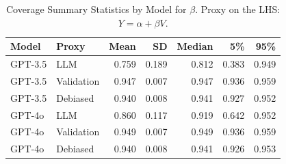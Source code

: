 \begin{table}

\caption{Coverage Summary Statistics by Model for $\beta$. Proxy on the LHS: $Y = \alpha + \beta V$.}
\centering
\begin{tabular}[t]{llrrrrr}
\toprule
Model & Proxy & Mean & SD & Median & 5\% & 95\%\\
\midrule
GPT-3.5 & LLM & 0.759 & 0.189 & 0.812 & 0.383 & 0.949\\
GPT-3.5 & Validation & 0.947 & 0.007 & 0.947 & 0.936 & 0.959\\
GPT-3.5 & Debiased & 0.940 & 0.008 & 0.941 & 0.927 & 0.952\\
GPT-4o & LLM & 0.860 & 0.117 & 0.919 & 0.642 & 0.952\\
GPT-4o & Validation & 0.949 & 0.007 & 0.949 & 0.936 & 0.959\\
GPT-4o & Debiased & 0.940 & 0.008 & 0.941 & 0.926 & 0.953\\
\bottomrule
\end{tabular}
\end{table}
